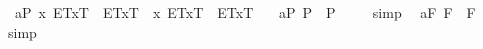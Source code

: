 \begin{isabellebody}
\ \ a{}{}{\isacharunderscore}{}{\isacharunderscore}P{\isacharcolon}\ {\isachardoublequoteopen}{\isacharbrackleft}\isactrlbold {\isasymdiamond}{\isacharparenleft}\isactrlbold {\isasymexists}x{\isachardot}\ {\isasymlparr}E\isactrlsup T{\isacharcomma}x\isactrlsup T{\isasymrparr}\ \isactrlbold {\isasymand}\ \isactrlbold {\isasymdiamond}{\isacharparenleft}\isactrlbold {\isasymnot}{\isasymlparr}E\isactrlsup T{\isacharcomma}x\isactrlsup T{\isasymrparr}{\isacharparenright}{\isacharparenright}\ \isactrlbold {\isasymand}\ \isactrlbold {\isasymdiamond}{\isacharparenleft}\isactrlbold {\isasymnot}{\isacharparenleft}\isactrlbold {\isasymexists}x{\isachardot}\ {\isasymlparr}E\isactrlsup T{\isacharcomma}x\isactrlsup T{\isasymrparr}\ \isactrlbold {\isasymand}\ \isactrlbold {\isasymdiamond}{\isacharparenleft}\isactrlbold {\isasymnot}{\isasymlparr}E\isactrlsup T{\isacharcomma}x\isactrlsup T{\isasymrparr}{\isacharparenright}{\isacharparenright}{\isacharparenright}{\isacharbrackright}\ {\isacharequal}\ {\isasymtop}{\isachardoublequoteclose}%
\isamarkuptrue%
\isamarkupfalse%
\ a{}{}{\isacharunderscore}{}{\isacharunderscore}P{\isacharcolon}\ {\isachardoublequoteopen}{\isacharbrackleft}{\isasymA}{\isacharparenleft}{\isasymphi}\isactrlsup P{\isacharparenright}\ \isactrlbold {\isasymrightarrow}\ \isactrlbold {\isasymbox}{\isacharparenleft}{\isasymA}{\isacharparenleft}{\isasymphi}\isactrlsup P{\isacharparenright}{\isacharparenright}{\isacharbrackright}\ {\isacharequal}\ {\isasymtop}{\isachardoublequoteclose}%
\isadelimproof
\ %
\endisadelimproof
%
\isatagproof
{}\isamarkupfalse%
\ simp\ \isamarkupfalse%
%
\endisatagproof
{\isafoldproof}%
%
\isadelimproof
%
\endisadelimproof
\isanewline
{}\isamarkupfalse%
\ a{}{}{\isacharunderscore}{}{\isacharunderscore}F{\isacharcolon}\ {\isachardoublequoteopen}{\isacharbrackleft}{\isasymA}{\isacharparenleft}{\isasymphi}\isactrlsup F{\isacharparenright}\ \isactrlbold {\isasymrightarrow}\ \isactrlbold {\isasymbox}{\isacharparenleft}{\isasymA}{\isacharparenleft}{\isasymphi}\isactrlsup F{\isacharparenright}{\isacharparenright}{\isacharbrackright}\ {\isacharequal}\ {\isasymtop}{\isachardoublequoteclose}%
\isadelimproof
\ %
\endisadelimproof
%
\isatagproof
{}\isamarkupfalse%
\ simp\ \isamarkupfalse%
%
\endisatagproof
{\isafoldproof}%
%
\isadelimproof
%
\endisadelimproof
\isanewline
{}\isamarkupfalse%

\end{isabellebody}
